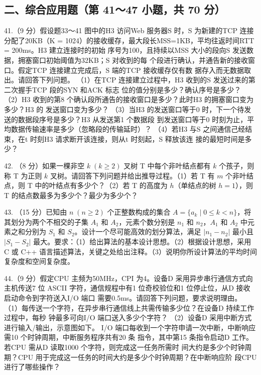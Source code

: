 \documentclass[UTF8,11pt]{ctexart}
\begin{document}
\subsection*{二、综合应用题（第 41～47 小题，共 70 分）}

41.（9 分）假设题33～41 图中的H3 访问Web 服务器S 时，S 为新建的TCP 连接分配了20KB（K = 1024）的接收缓存，最大段长MSS=1KB，平均往返时间RTT = 200ms。H3 建立连接时的初始 序号为100，且持续以MSS 大小的段向S 发送数据，拥塞窗口初始阈值为32KB；S 对收到的每 个段进行确认，并通告新的接收窗口。假定TCP 连接建立完成后，S 端的TCP 接收缓存仅有数 据存入而无数据取出。请回答下列问题。 （1）在TCP 连接建立过程中，H3 收到的S 发送过来的第二次握手TCP 段的SYN 和ACK 标志 位的值分别是多少？确认序号是多少？ （2）H3 收到的第8 个确认段所通告的接收窗口是多少？此时H3 的拥塞窗口变为多少？H3 的 发送窗口变为多少？ （3）当H3 的发送窗口等于0 时，下一个待发送的数据段序号是多少？H3 从发送第1 个数据段 到发送窗口等于0 时刻为止，平均数据传输速率是多少（忽略段的传输延时）？ （4）若H3 与S 之间通信己经结束，在t 时刻H3 请求断开该连接，则从t 时刻起，S 释放该连 接的最短时间是多少？


42. （8 分）如果一棵非空 \(\displaystyle k\;(k\ge2)\) 叉树 T 中每个非叶结点都有 \(\displaystyle k\) 个孩子，则称 T 为正则 \(\displaystyle k\) 叉树。请回答下列问题并给出推导过程。（1）若 T 有 \(\displaystyle m\) 个非叶结点，则 T 中的叶结点有多少个？（2）若 T 的高度为 \(\displaystyle h\)（单结点的树 \(\displaystyle h=1\)），则 T 的结点数最多为多少个？最少为多少个？


43. （15 分）已知由 \(\displaystyle n\;(n\ge2)\) 个正整数构成的集合 \(\displaystyle A=\{a_k\mid0\le k<n\}\)，将其划分为两个不相交的子集 \(\displaystyle A_1\) 和 \(\displaystyle A_2\)，元素个数分别是 \(\displaystyle n_1\) 和 \(\displaystyle n_2\)，\(\displaystyle A_1\) 和 \(\displaystyle A_2\) 中元素之和分别为 \(\displaystyle S_1\) 和 \(\displaystyle S_2\)。设计一个尽可能高效的划分算法，满足 \(\displaystyle |n_1-n_2|\) 最小且 \(\displaystyle |S_1-S_2|\) 最大。要求：（1）给出算法的基本设计思想。（2）根据设计思想，采用 C 或 C++ 语言描述算法，关键之处给出注释。（3）说明你所设计算法的平均时间复杂度和空间复杂度。


44.（9 分）假定CPU 主频为50MHz，CPI 为4。设备D 采用异步串行通信方式向主机传送7 位 ASCII 字符，通信规程中有1 位奇校验位和1 位停止位，从D 接收启动命令到字符送入I/O 端口 需要0.5ms。请回答下列问题，要求说明理由。 （1）每传送一个字符，在异步串行通信线上共需传输多少位？在设备D 持续工作过程中，每秒 钟最多可向I/O 端口送入多少个字符？ （2）设备D 采用中断方式进行输入/输出，示意图如下。 I/O 端口每收到一个字符申请一次中断，中断响应需10 个时钟周期，中断服务程序共有20 条 指令，其中第15 条指令启动D 工作。若CPU 需从D 读取1000 个字符，则完成这一任务所需时 间大约是多少个时钟周期？CPU 用于完成这一任务的时间大约是多少个时钟周期？在中断响应阶 段CPU 进行了哪些操作？
\end{document}
